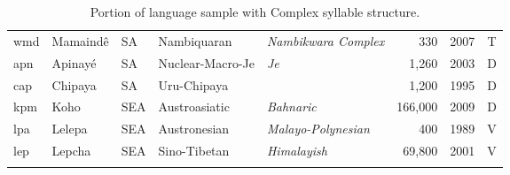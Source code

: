\begin{table}
\begin{tabularx}{\textwidth}{lQlQQrlc}
 wmd & {{Mamaindê}} &  SA & {Nambiquaran} & {\textit{Nambikwara Complex}} &  330 & 2007 & T\\
 apn & {{Apinayé}} &  SA & {Nuclear-Macro-Je} & {\textit{Je}} &  1,260 & 2003 & D\\
 cap & {{Chipaya}} &  SA & {Uru-Chipaya} &  &  1,200 & 1995 & D\\
 kpm & {{Koho}} &  SEA  & {Austroasiatic} & {\textit{Bahnaric}} &  166,000 & 2009 & D\\
 lpa & {{Lelepa}} &  SEA  & {Austronesian} & {\textit{Malayo-Polynesian}} &  400 & 1989 & V\\
 lep & {{Lepcha}} &  SEA  & {Sino-Tibetan} & {\textit{Himalayish}} &  69,800 & 2001 & V\\
\lspbottomrule
\end{tabularx}
\caption{Portion of language sample with Complex syllable structure.\label{tab:A.3}}
\end{table}


